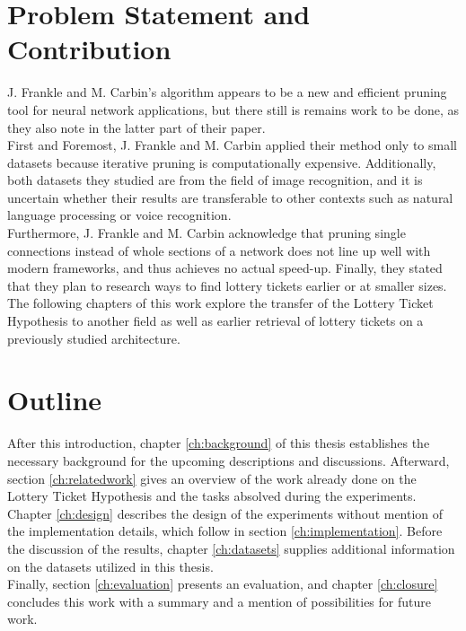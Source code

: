 \section{Problem Statement and Contribution}
J. Frankle and M. Carbin's algorithm appears to be a new and efficient pruning tool for neural network applications, but there still is remains work to be done, as they also note in the latter part of their paper.\\
First and Foremost, J. Frankle and M. Carbin applied their method only to small datasets because iterative pruning is computationally expensive. \cite{LTH} Additionally, both datasets they studied are from the field of image recognition, and it is uncertain whether their results are transferable to other contexts such as natural language processing or voice recognition.\\
Furthermore, J. Frankle and M. Carbin acknowledge that pruning single connections instead of whole sections of a network does not line up well with modern frameworks, and thus achieves no actual speed-up. Finally, they stated that they plan to research ways to find lottery tickets earlier or at smaller sizes.\cite{LTH}\\
The following chapters of this work explore the transfer of the Lottery Ticket Hypothesis to another field as well as earlier retrieval of lottery tickets on a previously studied architecture.


\section{Outline}

After this introduction, chapter \ref{ch:background} of this thesis establishes the necessary background for the upcoming descriptions and discussions. Afterward, section \ref{ch:relatedwork} gives an overview of the work already done on the Lottery Ticket Hypothesis and the tasks absolved during the experiments. Chapter \ref{ch:design} describes the design of the experiments without mention of the implementation details, which follow in section \ref{ch:implementation}. Before the discussion of the results, chapter \ref{ch:datasets} supplies additional information on the datasets utilized in this thesis.\\
Finally, section \ref{ch:evaluation} presents an evaluation, and chapter \ref{ch:closure} concludes this work with a summary and a mention of possibilities for future work.
